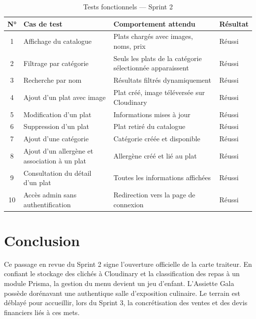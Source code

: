 \begin{table}[H]
    \centering
    \caption{Tests fonctionnels --- Sprint 2}
    \label{tab:tests_sprint2}
    \renewcommand{\arraystretch}{1.3}
    \begin{tabular}{|c|p{3cm}|p{3.5cm}|p{2.5cm}|}
        \hline
        \textbf{N°} & \textbf{Cas de test} & \textbf{Comportement attendu} & \textbf{Résultat} \\
        \hline
        1 & Affichage du catalogue & Plats chargés avec images, noms, prix & Réussi \\
        \hline
        2 & Filtrage par catégorie & Seuls les plats de la catégorie sélectionnée apparaissent & Réussi \\
        \hline
        3 & Recherche par nom & Résultats filtrés dynamiquement & Réussi \\
        \hline
        4 & Ajout d'un plat avec image & Plat créé, image téléversée sur Cloudinary & Réussi \\
        \hline
        5 & Modification d'un plat & Informations mises à jour & Réussi \\
        \hline
        6 & Suppression d'un plat & Plat retiré du catalogue & Réussi \\
        \hline
        7 & Ajout d'une catégorie & Catégorie créée et disponible & Réussi \\
        \hline
        8 & Ajout d'un allergène et association à un plat & Allergène créé et lié au plat & Réussi \\
        \hline
        9 & Consultation du détail d'un plat & Toutes les informations affichées & Réussi \\
        \hline
        10 & Accès admin sans authentification & Redirection vers la page de connexion & Réussi \\
        \hline
    \end{tabular}
\end{table}

\section{Conclusion}

Ce passage en revue du Sprint 2 signe l'ouverture officielle de la carte traiteur. En confiant le stockage des clichés à Cloudinary et la classification des repas à un module Prisma, la gestion du menu devient un jeu d'enfant. L'Assiette Gala possède dorénavant une authentique salle d'exposition culinaire. Le terrain est déblayé pour accueillir, lors du Sprint 3, la concrétisation des ventes et des devis financiers liés à ces mets.
